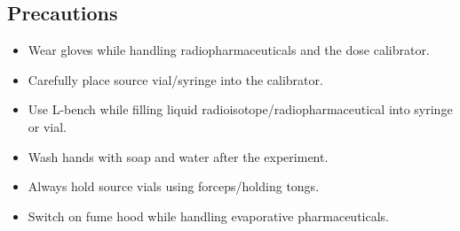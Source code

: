 \subsection{Precautions}
\begin{itemize}
	\item Wear gloves while handling radiopharmaceuticals and the dose calibrator.
	\item Carefully place source vial/syringe into the calibrator.
	\item Use L-bench while filling liquid radioisotope/radiopharmaceutical into syringe or vial.
	\item Wash hands with soap and water after the experiment.
	\item Always hold source vials using forceps/holding tongs.
	\item Switch on fume hood while handling evaporative pharmaceuticals.
\end{itemize}
